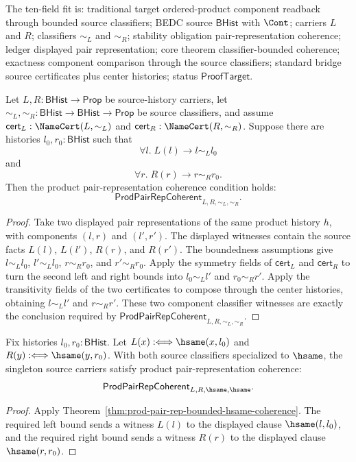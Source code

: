 \begin{theorem}
\label{thm:prod-pair-rep-classifier-bounded-coherence}
The ten-field fit is: traditional target ordered-product component readback
through bounded source classifiers; BEDC source $\mathsf{BHist}$ with $\Cont$;
carriers $L$ and $R$; classifiers $\sim_L$ and $\sim_R$; stability obligation
pair-representation coherence; ledger displayed pair representation; core
theorem classifier-bounded coherence; exactness component comparison through
the source classifiers; standard bridge source certificates plus center
histories; status $\mathsf{ProofTarget}$.

Let $L,R:\mathsf{BHist}\to\mathsf{Prop}$ be source-history carriers, let
$\sim_L,\sim_R:\mathsf{BHist}\to\mathsf{BHist}\to\mathsf{Prop}$ be source
classifiers, and assume
$\mathsf{cert}_L:\NameCert(L,\sim_L)$ and
$\mathsf{cert}_R:\NameCert(R,\sim_R)$. Suppose there are histories
$l_0,r_0:\mathsf{BHist}$ such that
$$
\forall l.\;L(l)\to l\sim_L l_0
$$
and
$$
\forall r.\;R(r)\to r\sim_R r_0.
$$
Then the product pair-representation coherence condition holds:
$$
\mathsf{ProdPairRepCoherent}_{L,R,\sim_L,\sim_R}.
$$
\end{theorem}
\begin{proof}
Take two displayed pair representations of the same product history $h$, with
components $(l,r)$ and $(l',r')$. The displayed witnesses contain the source
facts $L(l)$, $L(l')$, $R(r)$, and $R(r')$. The boundedness assumptions give
$l\sim_L l_0$, $l'\sim_L l_0$, $r\sim_R r_0$, and $r'\sim_R r_0$. Apply the
symmetry fields of $\mathsf{cert}_L$ and $\mathsf{cert}_R$ to turn the second
left and right bounds into $l_0\sim_L l'$ and $r_0\sim_R r'$. Apply the
transitivity fields of the two certificates to compose through the center
histories, obtaining $l\sim_L l'$ and $r\sim_R r'$. These two component
classifier witnesses are exactly the conclusion required by
$\mathsf{ProdPairRepCoherent}_{L,R,\sim_L,\sim_R}$.
\end{proof}

\begin{theorem}
\label{thm:prod-pair-rep-singleton-coherence}
Fix histories $l_0,r_0:\mathsf{BHist}$. Let
$L(x):\Longleftrightarrow\hsame(x,l_0)$ and
$R(y):\Longleftrightarrow\hsame(y,r_0)$. With both source classifiers
specialized to $\hsame$, the singleton source carriers satisfy product
pair-representation coherence:
$$
\mathsf{ProdPairRepCoherent}_{L,R,\hsame,\hsame}.
$$
\end{theorem}
\begin{proof}
Apply Theorem~\ref{thm:prod-pair-rep-bounded-hsame-coherence}. The required
left bound sends a witness $L(l)$ to the displayed clause $\hsame(l,l_0)$, and
the required right bound sends a witness $R(r)$ to the displayed clause
$\hsame(r,r_0)$.
\end{proof}

